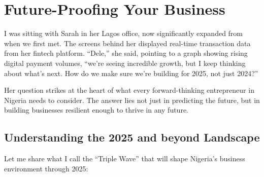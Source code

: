 
\chapter{Future-Proofing Your Business}\label{ch:future-proofing-your-business}

\begin{importantbox}
I was sitting with Sarah in her Lagos office, now significantly expanded from when we first met. The screens behind her displayed real-time transaction data from her fintech platform. ``Dele,'' she said, pointing to a graph showing rising digital payment volumes, ``we're seeing incredible growth, but I keep thinking about what's next. How do we make sure we're building for 2025, not just 2024?''

Her question strikes at the heart of what every forward-thinking entrepreneur in Nigeria needs to consider. The answer lies not just in predicting the future, but in building businesses resilient enough to thrive in any future.
\end{importantbox}

\section{Understanding the 2025 and beyond Landscape}\label{sec:understanding-2025-landscape}

Let me share what I call the ``Triple Wave'' that will shape Nigeria's business environment through 2025:

